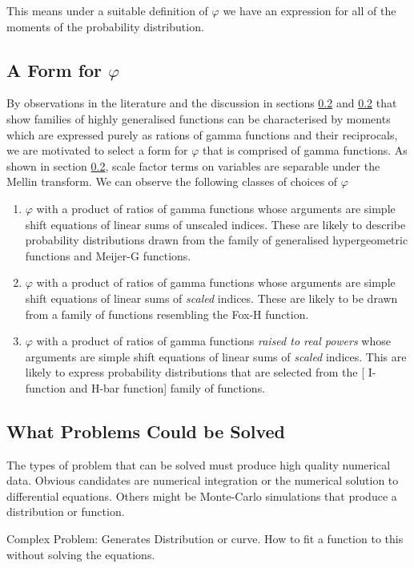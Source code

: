 \documentclass{article}
\begin{document}
This means under a suitable definition of $\varphi$ we have an expression for all of the moments of the probability distribution.
\subsection{A Form for $\varphi$}
By observations in the literature and the discussion in sections \ref{} and \ref{} that show families of highly generalised functions can be characterised by moments which are expressed purely as rations of gamma functions and their reciprocals, we are motivated to select a form for $\varphi$ that is comprised of gamma functions. As shown in section \ref{}, scale factor terms on variables are separable under the Mellin transform. We can observe the following classes of choices of $\varphi$ \begin{enumerate}
\item $\varphi$ with a product of ratios of gamma functions whose arguments are simple shift equations of linear sums of unscaled indices. These are likely to describe probability distributions drawn from the family of generalised hypergeometric functions and Meijer-G functions.
\item $\varphi$ with a product of ratios of gamma functions whose arguments are simple shift equations of linear sums of \emph{scaled} indices. These are likely to be drawn from a family of functions resembling the Fox-H function.
\item $\varphi$ with a product of ratios of gamma functions \emph{raised to real powers} whose arguments are simple shift equations of linear sums of \emph{scaled} indices. This are likely to express probability distributions that are selected from the [{\color{red} I-function and H-bar function}] family of functions.
\end{enumerate}


\subsection{What Problems Could be Solved}
The types of problem that can be solved must produce high quality numerical data. Obvious candidates are numerical integration or the numerical solution to differential equations. Others might be Monte-Carlo simulations that produce a distribution or function.




Complex Problem: Generates Distribution or curve. How to fit a function to this without solving the equations.
\end{document}
